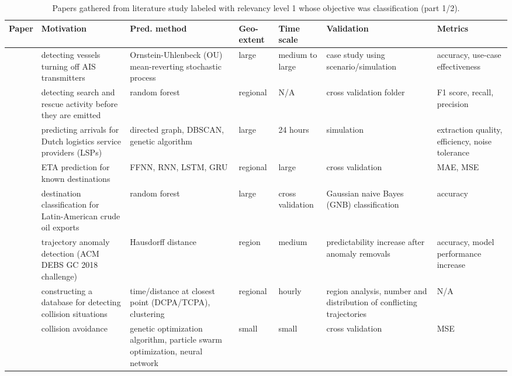 \noindent
\begin{table}[htbp]
{\small\begin{tabularx}{1.2\textwidth}{p{0.6in} X X p{0.5in} p{0.4in} X p{0.5in}}
    \toprule
    \textbf{Paper} & \textbf{Motivation} & \textbf{Pred. method} & \textbf{Geo-extent} & \textbf{Time scale} & \textbf{Validation} & \textbf{Metrics} \\ \midrule
    \cite{Braca2018DetectingProcess} & detecting vessels turning off AIS transmitters & Ornstein-Uhlenbeck (OU) mean-reverting stochastic process & large & medium to large & case study using scenario/simulation & accuracy, use-case effectiveness \\ \midrule
    \cite{Chatzikokolakis2018MiningRescue} & detecting search and rescue activity before they are emitted & random forest & regional & N/A & cross validation folder & F1 score, recall, precision \\ \midrule
    \cite{Dobrkovic2015UsingData} & predicting arrivals for Dutch logistics service providers (LSPs) & directed graph, DBSCAN, genetic algorithm & large & 24 hours & simulation & extraction quality, efficiency, noise tolerance \\ \midrule
    \cite{ElMekkaoui2020PredictingData} & ETA prediction for known destinations & FFNN, RNN, LSTM, GRU & regional & large & cross validation & MAE, MSE \\ \midrule
    \cite{Jia2019LatinApproach} & destination classification for Latin-American crude oil exports & random forest & large & cross validation & Gaussian naive Bayes (GNB) classification & accuracy \\ \midrule
    \cite{Jung2019OutlierPrediction} & trajectory anomaly detection (ACM DEBS GC 2018 challenge) & Hausdorff distance & region & medium & predictability increase after anomaly removals & accuracy, model performance increase \\ \midrule
    \cite{Lei2020MiningData} & constructing a database for detecting collision situations & time/distance at closest point (DCPA/TCPA), clustering & regional & hourly & region analysis, number and distribution of conflicting trajectories & N/A \\ \midrule
    \cite{Ma2020OptimizedTrajectory} & collision avoidance & genetic optimization algorithm, particle swarm optimization, neural network & small & small & cross validation & MSE \\ \midrule
\end{tabularx}}
\caption{Papers gathered from literature study labeled with relevancy level 1 whose objective was classification (part 1/2).}
\label{tab:lit_review_cat_1_5}
\end{table}

